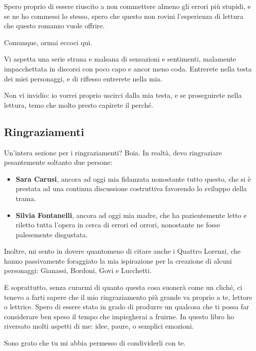 \documentclass[12pt]{book}
\begin{document}
Spero proprio di essere riuscito a non commettere almeno gli errori più stupidi, e se ne ho commessi lo stesso, spero che questo non rovini l'esperienza di lettura che questo romanzo vuole offrire.

Comunque, ormai eccoci qui.

Vi aspetta una serie strana e malsana di sensazioni e sentimenti, malamente impacchettata in discorsi con poco capo e ancor meno coda. Entrerete nella testa dei miei personaggi, e di riflesso entrerete nella mia. 

Non vi invidio: io vorrei proprio uscirci dalla mia testa, e se proseguirete nella lettura, temo che molto presto capirete il perché.

\newcommand{\hiddensubsection}[1]{
    \subsection*{#1}
}

\hiddensubsection{Ringraziamenti}

Un'intera sezione per i ringraziamenti? Boia. In realtà, devo ringraziare pesantemente soltanto due persone:

\begin{itemize}
	\item \textbf{Sara Carusi}, ancora ad oggi mia fidanzata nonostante tutto questo, che si è prestata ad una continua discussione costruttiva favorendo lo sviluppo della trama.
	\item \textbf{Silvia Fontanelli}, ancora ad oggi mia madre, che ha pazientemente letto e riletto tutta l'opera in cerca di errori ed orrori, nonostante ne fosse palesemente disgustata.
\end{itemize}

Inoltre, mi sento in dovere quantomeno di citare anche i Quattro Lorenzi, che hanno passivamente foraggiato la mia ispirazione per la creazione di alcuni personaggi: Gianassi, Bordoni, Govi e Lucchetti.

E soprattutto, senza curarmi di quanto questa cosa suonerà come un cliché, ci tenevo a farti sapere che il mio ringraziamento più grande va proprio a te, lettore o lettrice. Spero di essere stato in grado di produrre un qualcosa che ti possa far considerare ben speso il tempo che impiegherai a fruirne. In questo libro ho riversato molti aspetti di me: idee, paure, o semplici emozioni. 

Sono grato che tu mi abbia permesso di condividerli con te.

\newpage
\tableofcontents
\newpage


































\end{document}
